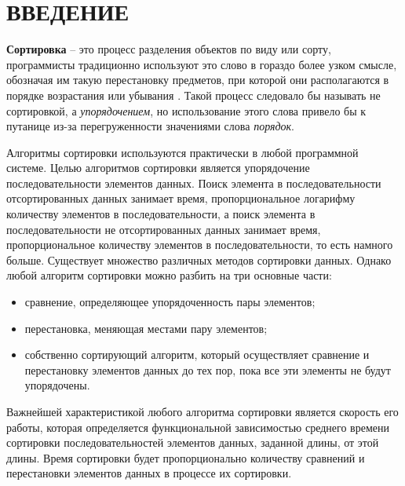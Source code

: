 {\centering \chapter*{ВВЕДЕНИЕ}}

\textbf{Сортировка} -- это процесс разделения объектов по виду или сорту, программисты традиционно используют это слово в гораздо более узком смысле, обозначая им такую перестановку предметов, при которой они располагаются в порядке возрастания или убывания \cite{knut}.
Такой процесс следовало бы называть не сортировкой, а \textit{упорядочением}, но использование этого слова привело бы к путанице из-за перегруженности значениями слова \textit{порядок}.

Алгоритмы сортировки используются практически в любой программной системе.
Целью алгоритмов сортировки является упорядочение последовательности элементов данных.
Поиск элемента в последовательности отсортированных данных занимает время, пропорциональное логарифму количеству элементов в последовательности, а поиск элемента в последовательности не отсортированных данных занимает время, пропорциональное количеству элементов в последовательности, то есть намного больше.
Существует множество различных методов сортировки данных.
Однако любой алгоритм сортировки можно разбить на три основные части:
\begin{itemize}[label=---]
    \item сравнение, определяющее упорядоченность пары элементов;
    \item перестановка, меняющая местами пару элементов;
    \item собственно сортирующий алгоритм, который осуществляет сравнение и перестановку элементов данных до тех пор, пока все эти элементы не будут упорядочены.
\end{itemize}

Важнейшей характеристикой любого алгоритма сортировки является скорость его работы, которая определяется функциональной зависимостью среднего времени сортировки последовательностей элементов данных, заданной длины, от этой длины. Время сортировки будет пропорционально количеству сравнений и перестановки элементов данных в процессе их сортировки.
